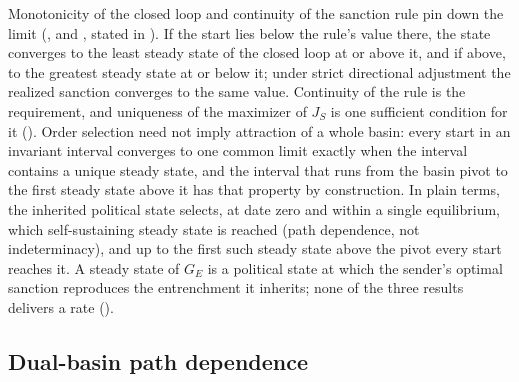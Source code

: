 Monotonicity of the closed loop and continuity of the sanction rule pin down the limit
(,  and
, stated in ). If the start
lies below the rule's value there, the state converges to the least steady
state of the closed loop at or above it, and if above, to the greatest steady
state at or below it; under strict directional adjustment the realized
sanction converges to the same value. Continuity of the rule is the
requirement, and uniqueness of the maximizer of $J_S$ is one
sufficient condition for it (). Order selection need not
imply attraction of a whole basin: every start in an invariant interval
converges to one common limit exactly when the interval contains a unique
steady state, and the interval that runs from the basin pivot to the first
steady state above it has that property by construction. In plain terms, the
inherited political state selects, at date zero and within a single
equilibrium, which self-sustaining steady state is reached (path dependence, not
indeterminacy), and up to the first such steady state above the pivot every
start reaches it. A steady state of $G_E$ is a political state at which the
sender's optimal sanction reproduces the entrenchment it inherits; none of
the three results delivers a rate ().

\subsection{Dual-basin path dependence}
\label{sec:mechanism:bistability}

